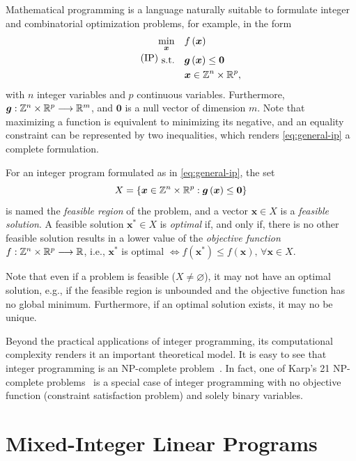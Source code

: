 Mathematical programming is a language naturally suitable to formulate integer and combinatorial optimization problems, for example, in the form
\begin{equation}\label{eq:general-ip}\tag{IP}
    \begin{split}
	\min_{\bm{x}} \quad & f\left( \bm{x} \right) \\
	\textrm{s.t.} \quad & \bm{g}\left( \bm{x} \right) \le \bm{0} \\
	  & \bm{x} \in \mathbb{Z}^{n}\times \mathbb{R}^{p}
    ,\end{split}
\end{equation}
with $n$ integer variables and $p$ continuous variables.
Furthermore, $\bm{g}: \mathbb{Z}^{n}\times \mathbb{R}^{p} \longrightarrow \mathbb{R}^{m}$,  and $\bm{0}$ is a null vector of dimension $m$.
Note that maximizing a function is equivalent to minimizing its negative, and an equality constraint can be represented by two inequalities, which renders \eqref{eq:general-ip} a complete formulation.

For an integer program formulated as in \eqref{eq:general-ip}, the set \[
X=\left\{ \bm{x}\in \mathbb{Z}^{n}\times \mathbb{R}^{p}: \bm{g}\left( \bm{x} \right) \le \bm{0}\right\} 
\] is named the \emph{feasible region} of the problem, and a vector $\bm{x}\in X$ is a \emph{feasible solution}.
A feasible solution $\bm{x}^{*}\in X$ is \emph{optimal} if, and only if, there is no other feasible solution results in a lower value of the \emph{objective function} $f: \mathbb{Z}^{n}\times \mathbb{R}^{p} \longrightarrow \mathbb{R}$, i.e., $\bm{x}^{*}$ is optimal $\iff f(\bm{x}^{*}) \le f(\bm{x}) ,\,\forall \bm{x}\in X$.

Note that even if a problem is feasible ($X\neq \varnothing$), it may not have an optimal solution, e.g., if the feasible region is unbounded and the objective function has no global minimum.
Furthermore, if an optimal solution exists, it may no be unique.

Beyond the practical applications of integer programming, its computational complexity renders it an important theoretical model.
It is easy to see that integer programming is an NP-complete problem~\cite{nemhauserIntegerCombinatorialOptimization1999}.
In fact, one of Karp's 21 NP-complete problems~\cite{karpReducibilityCombinatorialProblems1972} is a special case of integer programming with no objective function (constraint satisfaction problem) and solely binary variables.

\section{Mixed-Integer Linear Programs}

